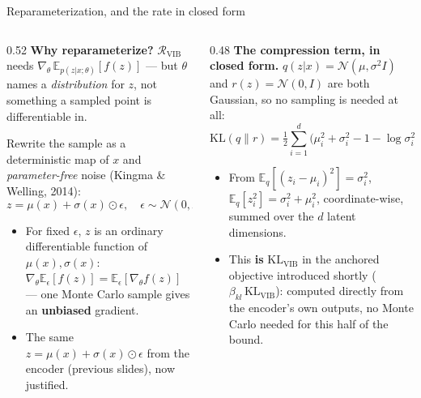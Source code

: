 \documentclass[aspectratio=169,11pt]{beamer}
\begin{document}
\begin{frame}{Reparameterization, and the rate in closed form}
\begin{columns}[T]
\begin{column}{0.52\textwidth}\footnotesize
\textbf{Why reparameterize?} $\mathcal R_{\text{VIB}}$ needs $\nabla_\theta\,
\mathbb E_{p(z|x;\theta)}[f(z)]$ --- but $\theta$ names a \emph{distribution} for $z$, not something
a sampled point is differentiable in.
\vspace{0.3em}

Rewrite the sample as a deterministic map of $x$ and \emph{parameter-free} noise (Kingma \& Welling,
2014):
\[ z=\mu(x)+\sigma(x)\odot\epsilon,\quad \epsilon\sim\mathcal N(0,I) \]
\vspace{-0.3em}
\begin{itemize}\footnotesize
\item For fixed $\epsilon$, $z$ is an ordinary differentiable function of $\mu(x),\sigma(x)$:
$\nabla_\theta\mathbb E_\epsilon[f(z)]=\mathbb E_\epsilon[\nabla_\theta f(z)]$ --- one Monte Carlo
sample gives an \textbf{unbiased} gradient.
\item The same $z=\mu(x)+\sigma(x)\odot\epsilon$ from the encoder (previous slides), now justified.
\end{itemize}
\end{column}
\begin{column}{0.48\textwidth}\footnotesize
\textbf{The compression term, in closed form.} $q(z|x)=\mathcal N(\mu,\sigma^2I)$ and
$r(z)=\mathcal N(0,I)$ are both Gaussian, so no sampling is needed at all:
\vspace{0.2em}
\[
\mathrm{KL}(q\|r)=\tfrac12{\textstyle\sum_{i=1}^{d}}\big(\mu_i^2+\sigma_i^2-1-\log\sigma_i^2\big)
\]
\vspace{-0.3em}
\begin{itemize}\footnotesize
\item From $\mathbb E_q[(z_i{-}\mu_i)^2]=\sigma_i^2$, $\mathbb E_q[z_i^2]=\sigma_i^2{+}\mu_i^2$,
coordinate-wise, summed over the $d$ latent dimensions.
\item This \textbf{is} $\mathrm{KL}_{\text{VIB}}$ in the anchored objective introduced shortly
($\beta_{kl}\,\mathrm{KL}_{\text{VIB}}$): computed directly from the encoder's own outputs, no Monte
Carlo needed for this half of the bound.
\end{itemize}
\end{column}
\end{columns}
\end{frame}
\end{document}
